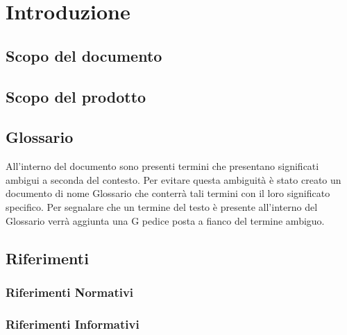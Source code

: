 \section{Introduzione}

\subsection{Scopo del documento}

\subsection{Scopo del prodotto}

\subsection{Glossario}
All’interno del  documento sono presenti termini che presentano significati ambigui a seconda del contesto.
Per evitare questa ambiguità è stato creato un  documento di nome Glossario che  conterrà tali termini con il loro significato specifico. Per segnalare che un termine del testo è presente all’interno del Glossario  
verrà aggiunta una G pedice posta a fianco del termine ambiguo. 

\subsection{Riferimenti}
\subsubsection{Riferimenti Normativi}


\subsubsection{Riferimenti Informativi}